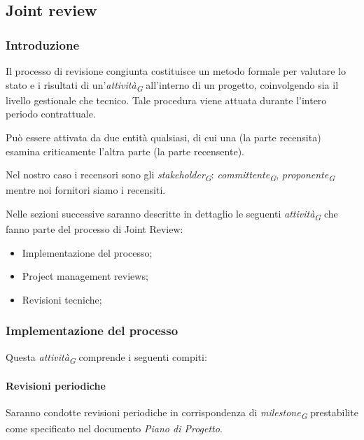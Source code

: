 \subsection{Joint review} 

\subsubsection{Introduzione}
Il processo di revisione congiunta costituisce un metodo formale per valutare lo stato e i risultati di un'\textit{attività}\textsubscript{\textit{G}} all'interno di un progetto, coinvolgendo sia il livello gestionale che tecnico. Tale procedura viene attuata durante l'intero periodo contrattuale.

Può essere attivata da due entità qualsiasi, di cui una (la parte recensita) esamina criticamente l'altra parte (la parte recensente).

\vspace{0.2cm}

Nel nostro caso i recensori sono gli \textit{stakeholder}\textsubscript{\textit{G}}: \textit{committente}\textsubscript{\textit{G}}, \textit{proponente}\textsubscript{\textit{G}} mentre noi fornitori siamo i recensiti.

\vspace{0.2cm}

Nelle sezioni successive saranno descritte in dettaglio le seguenti \textit{attività}\textsubscript{\textit{G}} che fanno parte del processo di Joint Review:
\begin{itemize}
    \item Implementazione del processo;
    \item Project management reviews;
    \item Revisioni tecniche;
\end{itemize}

\subsubsection{Implementazione del processo}
Questa \textit{attività}\textsubscript{\textit{G}} comprende i seguenti compiti: 

\paragraph{Revisioni periodiche}
Saranno condotte revisioni periodiche in corrispondenza di \textit{milestone}\textsubscript{\textit{G}} prestabilite come specificato nel documento \textit{Piano di Progetto}.

